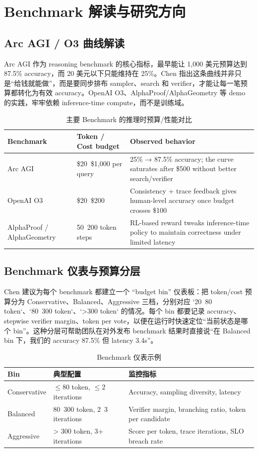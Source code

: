 \section{Benchmark 解读与研究方向}

\subsection{Arc AGI / O3 曲线解读}
Arc AGI 作为 reasoning benchmark 的核心指标，最早能让 1,000 美元预算达到 87.5\% accuracy，而 20 美元以下只能维持在 25\%。Chen 指出这条曲线并非只是“给钱就能做”，而是要同步排布 sampler、search 和 verifier，才能让每一笔预算都转化为有效 accuracy。OpenAI O3、AlphaProof/AlphaGeometry 等 demo 的实践，牢牢依赖 inference-time compute，而不是训练域。

\begin{table}[H]
\centering
\caption{主要 Benchmark 的推理时预算/性能对比}
\begin{tabular}{p{}p{}p{}}
\toprule
Benchmark & Token / Cost budget & Observed behavior \\
\midrule
Arc AGI & \$20~\$1,000 per query & 25\% → 87.5\% accuracy; the curve saturates after \$500 without better search/verifier \\
OpenAI O3 & \$20~\$200 & Consistency + trace feedback gives human-level accuracy once budget crosses \$100 \\
AlphaProof / AlphaGeometry & 50~200 token steps & RL-based reward tweaks inference-time policy to maintain correctness under limited latency \\
\bottomrule
\end{tabular}
\end{table}

\subsection{Benchmark 仪表与预算分层}
Chen 建议为每个 benchmark 都建立一个 ``budget bin'' 仪表板：把 token/cost 预算分为 Conservative、Balanced、Aggressive 三档，分别对应 `20~80 token`、`80~300 token`、`>300 token` 的情况。每个 bin 都要记录 accuracy、stepwise verifier margin、token per vote，以便在运行时快速定位“当前状态是哪个 bin”。这种分层可帮助团队在对外发布 benchmark 结果时直接说“在 Balanced bin 下，我们的 accuracy 87.5\% 但 latency 3.4s”。

\begin{table}[H]
\centering
\caption{Benchmark 仪表示例}
\begin{tabular}{p{}p{}p{}}
\toprule
Bin & 典型配置 & 监控指标 \\
\midrule
Conservative & $\leq 80$ token, $\leq 2$ iterations & Accuracy, sampling diversity, latency \\
Balanced & 80~300 token, 2~3 iterations & Verifier margin, branching ratio, token per candidate \\
Aggressive & > 300 token, 3+ iterations & Score per token, trace iterations, SLO breach rate \\
\bottomrule
\end{tabular}
\end{table}

